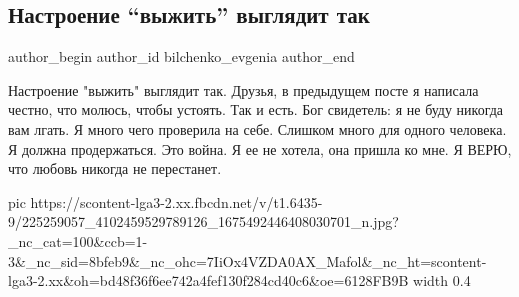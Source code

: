  
 
 
 
 
 
\subsection{Настроение \enquote{выжить} выглядит так}
\label{sec:28_07_2021.fb.bilchenko_evgenia.1.nastrojenie_vyzhyt}
 
\ifcmt
 author_begin
   author_id bilchenko_evgenia
 author_end
\fi

Настроение "выжить" выглядит так. Друзья, в предыдущем посте я написала честно,
что молюсь, чтобы устоять. Так и есть. Бог свидетель: я не буду никогда вам
лгать. Я много чего проверила на себе. Слишком много для одного человека. Я
должна продержаться. Это война. Я ее не хотела, она пришла ко мне. Я ВЕРЮ, что
любовь никогда не перестанет.

\ifcmt
  pic https://scontent-lga3-2.xx.fbcdn.net/v/t1.6435-9/225259057_4102459529789126_1675492446408030701_n.jpg?_nc_cat=100&ccb=1-3&_nc_sid=8bfeb9&_nc_ohc=7IiOx4VZDA0AX_Mafol&_nc_ht=scontent-lga3-2.xx&oh=bd48f36f6ee742a4fef130f284cd40c6&oe=6128FB9B
  width 0.4
\fi



